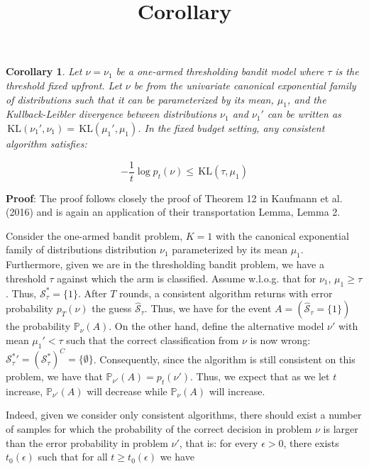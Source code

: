 \documentclass[12pt,]{article}
\title{Corollary}
\author{}
\date{}
\newtheorem{corollary}{Corollary}
\newcommand{\KL}{\,\text{KL}}
\begin{document}
\maketitle

{
\hypersetup{linkcolor=black}
\setcounter{tocdepth}{2}
\tableofcontents
}
\begin{corollary}
Let $\nu = \nu_1$ be a one-armed thresholding bandit model where $\tau$ is the threshold fixed upfront. Let $\nu$ be from the univariate canonical exponential family of distributions such that it can be parameterized by its mean, $\mu_1$, and the Kullback-Leibler divergence between distributions $\nu_1$ and $\nu_1'$ can be written as $\KL(\nu_1', \nu_1) = \KL(\mu_1', \mu_1)$. In the fixed budget setting, any consistent algorithm satisfies:

$$
- \frac{1}{t} \log p_t(\nu) \leq \KL(\tau, \mu_1)
$$
\end{corollary}

\textbf{Proof}: The proof follows closely the proof of Theorem 12 in
Kaufmann et al. (2016) and is again an application of their
transportation Lemma, Lemma 2.

Consider the one-armed bandit problem, \(K = 1\) with the canonical
exponential family of distributions distribution \(\nu_1\) parameterized
by its mean \(\mu_1\). Furthermore, given we are in the thresholding
bandit problem, we have a threshold \(\tau\) against which the arm is
classified. Assume w.l.o.g. that for \(\nu_1\), \(\mu_1 \geq \tau\).
Thus, \(\mathcal{S}_{\tau}^* = \{1\}\). After \(T\) rounds, a consistent
algorithm returns with error probability \(p_T(\nu)\) the guess
\(\hat{\mathcal{S}}_{\tau}\). Thus, we have for the event
\(A = (\hat{\mathcal{S}}_\tau = \{1\})\) the probability
\(\mathbb{P}_{\nu}(A)\). On the other hand, define the alternative model
\(\nu'\) with mean \(\mu_1' < \tau\) such that the correct
classification from \(\nu\) is now wrong:
\(\mathcal{S}_{\tau}^* {'} = (\mathcal{S}_{\tau}^*)^C = \{\emptyset\}\).
Consequently, since the algorithm is still consistent on this problem,
we have that \(\mathbb{P}_{\nu'}(A) = p_t(\nu')\). Thus, we expect that
as we let \(t\) increase, \(\mathbb{P}_{\nu'}(A)\) will decrease while
\(\mathbb{P}_{\nu}(A)\) will increase.

Indeed, given we consider only consistent algorithms, there should exist
a number of samples for which the probability of the correct decision in
problem \(\nu\) is larger than the error probability in problem
\(\nu'\), that is: for every \(\epsilon > 0\), there exists
\(t_0(\epsilon)\) such that for all \(t \geq t_0(\epsilon)\) we have
\end{document}
